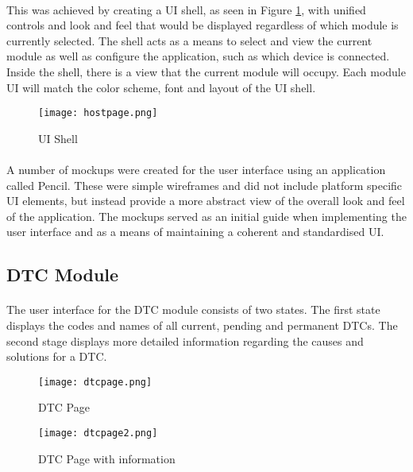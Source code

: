 	\paragraph{}{
	This was achieved by creating a UI shell, as seen in Figure \ref{fig:UIShell}, with unified controls and look and feel that would be displayed regardless of which module is currently selected. The shell acts as a means to select and view the current module as well as configure the application, such as which device is connected. Inside the shell, there is a view that the current module will occupy. Each module UI will match the color scheme, font and layout of the UI shell.
	}
	
	\begin{figure}[h]
		\begin{center}
			\texttt{[image: hostpage.png]}
			\caption{UI Shell}
			\label{fig:UIShell}
		\end{center}
	\end{figure}	
	\newpage
	\paragraph{}{
	A number of mockups were created for the user interface using an application called Pencil. These were simple wireframes and did not include platform specific UI elements, but instead provide a more abstract view of the overall look and feel of the application. The mockups served as an initial guide when implementing the user interface and as a means of maintaining a coherent and standardised UI. 
	}
	
	\subsection{DTC Module}
		\paragraph{}{						
		The user interface for the DTC module consists of two states. The first state displays the codes and names of all current, pending and permanent DTCs. The second stage displays more detailed information regarding the causes and solutions for a DTC.
		}
		
		\begin{figure}[h]
			\begin{center}								
				\begin{minipage}{0.49\textwidth}
					\texttt{[image: dtcpage.png]}
					\caption{DTC Page}						
					\label{fig:DTCPage1}
				\end{minipage}
				\hfill			
				\begin{minipage}{0.49\textwidth}
					\texttt{[image: dtcpage2.png]}
					\caption{DTC Page with information}						
					\label{fig:DTCPage2}
				\end{minipage}									
			\end{center}
		\end{figure}
		
